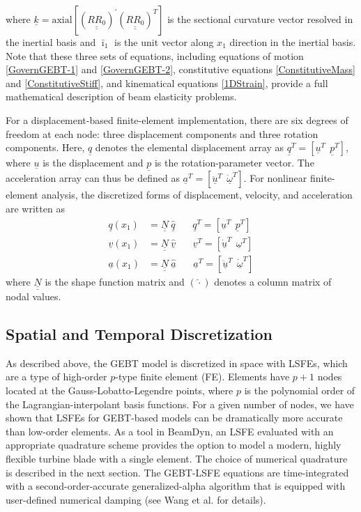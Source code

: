 \documentclass{aiaa-tc}
\newcommand{\tens}[1]{\underline{\underline{#1}}}
\renewcommand{\vec}[1]{\underline{#1}}
\begin{document}
where $\vec{k} = \mathrm{axial}[(\tens{R R_0})^\prime (\tens{R R_0})^T]$ is the sectional
curvature vector resolved in the inertial basis and $\bar{\imath}_1$ is the unit
vector along $x_1$ direction in the inertial basis. Note that these
three sets of equations, including equations of motion
\eqref{GovernGEBT-1} and \eqref{GovernGEBT-2}, constitutive equations
\eqref{ConstitutiveMass} and \eqref{ConstitutiveStiff}, and kinematical
equations \eqref{1DStrain}, provide a full mathematical description of beam elasticity problems. 

For a displacement-based finite-element implementation, there are six
degrees of freedom at each node: three displacement components and three
rotation components. Here, $\vec{q}$ denotes the elemental
displacement array as $\underline{q}^T=\left[
\underline{u}^T~~\underline{p}^T\right]$, where $\vec{u}$ is the
displacement and $\vec{p}$ is the rotation-parameter vector. The
acceleration array can thus be defined as $\underline{a}^T=\left[
\ddot{\underline{u}}^T~~ \dot{\underline{\omega}}^T \right]$. For nonlinear
finite-element analysis, the discretized forms of
displacement, velocity, and acceleration are written as
\begin{align}
	\label{DiscretizedDisp}
	\underline{q} (x_1) &= \underline{\underline{N}} ~\hat{\underline{q}}~~~~~~~~\underline{q}^T = \left[ \underline{u}^T~~\underline{p}^T \right] \\
	\label{DiscretizedVel}
	\underline{v}(x_1) &= \underline{\underline{N}}~\hat{\underline{v}}~~~~~~~~\underline{v}^T = \left[\underline{\dot{u}}^T~~\underline{\omega}^T \right] \\
	\label{DiscretizedAcc}
	\underline{a}(x_1) &= \underline{\underline{N}}~ \hat{\underline{a}}~~~~~~~~\underline{a}^T = \left[ \ddot{\underline{u}}^T~~\dot{\underline{\omega}}^T \right]	
\end{align}
where $\tens{N}$ is the shape function matrix and $(\hat{\cdot})$ denotes a
column matrix of nodal values.

\subsection{Spatial and Temporal Discretization}

As described above, the GEBT model is discretized in space with LSFEs\cite{Ronquist-Patera:1987}, which are a type of high-order $p$-type finite element (FE).   
Elements have $p+1$ nodes located at the Gauss-Lobatto-Legendre points, where $p$ is the polynomial order of the Lagrangian-interpolant basis functions.  
For a given number of nodes, we have shown\cite{Wang:SFE2013,Wang:GEBT2014} that LSFEs for GEBT-based models can be dramatically more accurate than low-order elements.   
As a tool in BeamDyn, an LSFE evaluated with an appropriate quadrature scheme provides the option to model a modern, highly flexible turbine blade with a single element.  
The choice of numerical quadrature is described in the next section.
The GEBT-LSFE equations are time-integrated with a second-order-accurate generalized-alpha algorithm that is equipped with user-defined numerical damping (see Wang et al.\cite{Wang-etal:2015} for details).  
\end{document}
